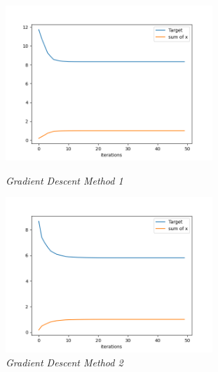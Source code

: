 \documentclass[12pt, a4paper, oneside]{article}
\begin{document}
\begin{figure}[H]
    \begin{minipage}[H]{0.5\linewidth} %
            \centering
            \includegraphics[width=7.8cm]{T of G1.png}
            \caption{\textit{Gradient Descent Method 1}}
     \end{minipage}
     \begin{minipage}[H]{0.5\linewidth}
        \hspace{0.2mm}
         \includegraphics[width=7.8cm]{T of G2.png}
         \caption{\textit{Gradient Descent Method 2}}
      \end{minipage}
\end{figure}
\end{document}
